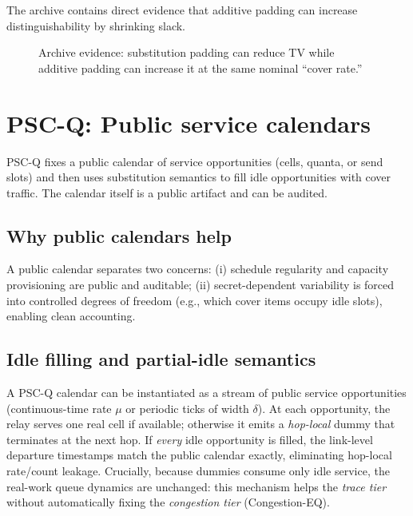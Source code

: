 \documentclass[11pt]{article}
\theoremstyle{definition}
\theoremstyle{remark}
\begin{document}
The archive contains direct evidence that additive padding can increase distinguishability by shrinking slack.

\begin{figure}[t]
\centering
{}
\caption{Archive evidence: substitution padding can reduce TV while additive padding can increase it at the same nominal ``cover rate.''}
\label{fig:tax}
\end{figure}

\section{PSC-Q: Public service calendars}
PSC-Q fixes a public calendar of service opportunities (cells, quanta, or send slots) and then uses substitution semantics to fill idle opportunities with cover traffic.
The calendar itself is a public artifact and can be audited.

\subsection{Why public calendars help}
A public calendar separates two concerns:
(i) schedule regularity and capacity provisioning are public and auditable;
(ii) secret-dependent variability is forced into controlled degrees of freedom (e.g., which cover items occupy idle slots), enabling clean accounting.

\subsection{Idle filling and partial-idle semantics}
A PSC-Q calendar can be instantiated as a stream of public service opportunities (continuous-time rate $\mu$ or periodic ticks of width $\delta$).
At each opportunity, the relay serves one real cell if available; otherwise it emits a \emph{hop-local} dummy that terminates at the next hop.
If \emph{every} idle opportunity is filled, the link-level departure timestamps match the public calendar exactly, eliminating hop-local rate/count leakage.
Crucially, because dummies consume only idle service, the real-work queue dynamics are unchanged: this mechanism helps the \emph{trace tier} without automatically fixing the \emph{congestion tier} (Congestion-EQ).
\end{document}
